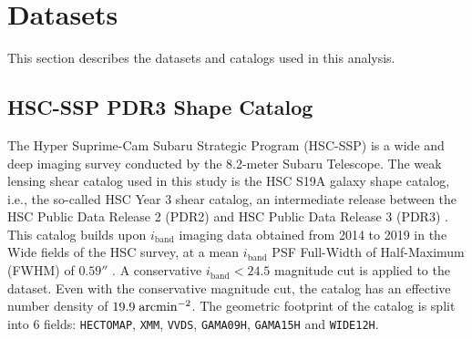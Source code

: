 \section{Datasets}
\label{sec:data}

This section describes the datasets and catalogs used in this analysis. 



\subsection{HSC-SSP PDR3 Shape Catalog}
\label{sec:data:hsc}

The Hyper Suprime-Cam Subaru Strategic Program (HSC-SSP) is a wide and deep imaging survey conducted by the 8.2-meter Subaru Telescope. The weak lensing shear catalog used in this study is the HSC S19A galaxy shape catalog, i.e., the so-called HSC Year 3 shear catalog\cite{HSCShapeCataloguePDR3Li2022}, an intermediate release between the HSC Public Data Release 2 (PDR2) \cite{hsc_pdr2} and HSC Public Data Release 3 (PDR3) \cite{HSC2022datarelease3}. This catalog builds upon $i_{\mathrm{band}}$ imaging data obtained from 2014 to 2019 in the Wide fields of the HSC survey, at a mean $i_{\mathrm{band}}$ PSF Full-Width of Half-Maximum (FWHM) of $0.59''$ \cite{HSCShapeCataloguePDR3Li2022}. A conservative $i_{\mathrm{band}}<24.5$ magnitude cut is applied to the dataset. Even with the conservative magnitude cut, the catalog has an effective number density of $19.9 {\;\rm arcmin}^{-2}$. The geometric footprint of the catalog is split into 6 fields: \texttt{HECTOMAP}, \texttt{XMM}, \texttt{VVDS}, \texttt{GAMA09H}, \texttt{GAMA15H} and \texttt{WIDE12H}.


